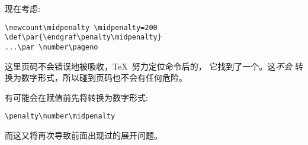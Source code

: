 \documentclass{book}
\begin{document}
现在考虑:
\begin{verbatim}
\newcount\midpenalty \midpenalty=200
\def\par{\endgraf\penalty\midpenalty}
...\par \number\pageno
\end{verbatim}

这里页码不会错误地被吸收，\TeX\ 努力定位命令后的，
它找到了一个。这{\em 不会} 转换为数字形式，所以碰到页码也不会有任何危险。


有可能会在赋值前先将转换为数字形式:

\begin{verbatim}
\penalty\number\midpenalty
\end{verbatim}

而这又将再次导致前面出现过的展开问题。


\endofchapter
\end{document}
